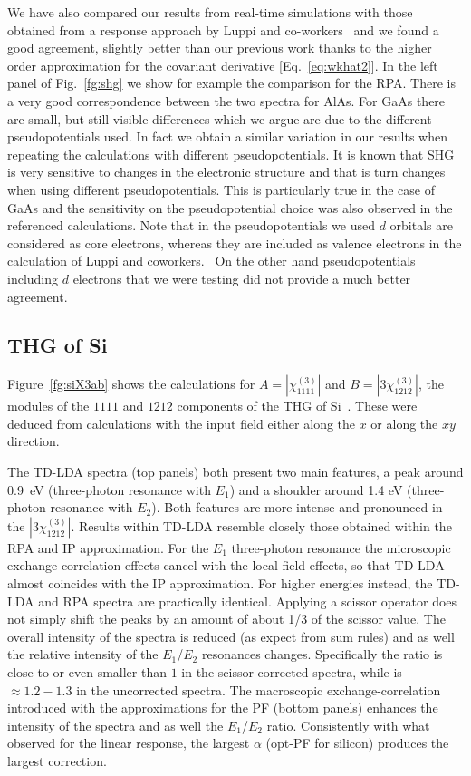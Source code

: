 We have also compared our results from real-time simulations with those obtained from a response approach by Luppi and co-workers~\cite{PhysRevB.82.235201} and we found a good agreement, slightly better than our previous work\cite{nloptics2013} thanks to the higher order approximation for the covariant derivative [Eq.~\eqref{eq:wkhat2}]. In the left panel of Fig.~\ref{fg:shg} we show for example the comparison for the RPA. There is a very good correspondence between the two spectra for AlAs. For GaAs there are small, but still visible differences which we argue are due to the different pseudopotentials used. In fact we obtain a similar variation in our results when repeating the calculations with different pseudopotentials. It is known that SHG is very sensitive to changes in the electronic structure and that is turn changes when using different pseudopotentials. This is particularly true in the case of GaAs and the sensitivity on the pseudopotential choice was also observed in the referenced calculations.  
Note that in the pseudopotentials we used $d$ orbitals are considered as core electrons, whereas they are included as valence electrons in the calculation of Luppi and coworkers.~\cite{PhysRevB.82.235201} On the other hand pseudopotentials including $d$ electrons that we were testing did not provide a much better agreement.  

\subsection{THG of Si} 



Figure~\ref{fg:siX3ab} shows the calculations for $A=|\chi^{(3)}_{1111}|$ and $B=|3\chi^{(3)}_{1212}|$, the modules of the $1111$ and $1212$ components of the THG of Si~\cite{Moss:89}. These were deduced from calculations with the input field either along the $x$ or along the $xy$ direction.

The TD-LDA spectra (top panels) both present two main features, a peak around 0.9~eV (three-photon resonance with $E_1$) and a shoulder around 1.4  eV (three-photon resonance with $E_2$). Both features are more intense and pronounced in the $|3\chi^{(3)}_{1212}|$. Results within TD-LDA resemble closely those obtained within the RPA and IP approximation. For the $E_1$ three-photon resonance the microscopic exchange-correlation effects cancel with the local-field effects, so that TD-LDA almost coincides with the IP approximation. For higher energies instead, the TD-LDA and RPA spectra are practically identical. Applying a scissor operator does not simply shift the peaks by an amount of about 1/3 of the scissor value. The overall intensity of the spectra is reduced (as expect from sum rules) and as well the relative intensity of the $E_1$/$E_2$ resonances changes. Specifically the ratio is close to or even smaller than $1$ in the scissor corrected spectra, while is $\approx 1.2-1.3$ in the uncorrected spectra. The macroscopic exchange-correlation introduced with the approximations for the PF (bottom panels) enhances the intensity of the spectra and as well the $E_1$/$E_2$ ratio. Consistently with what observed for the linear response, the largest $\alpha$ (opt-PF for silicon) produces the largest correction.

